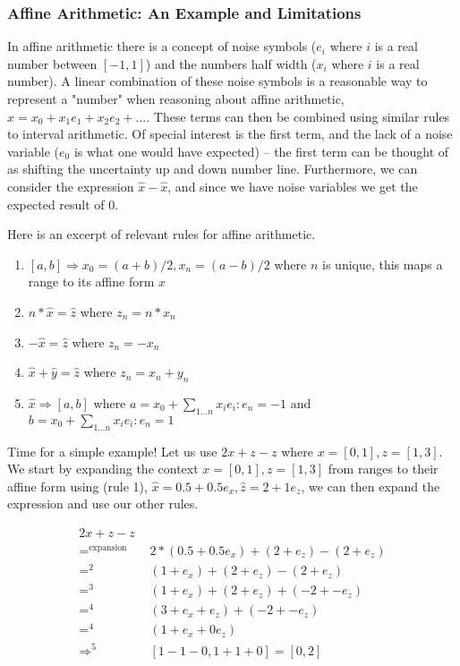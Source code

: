 \subsubsection{Affine Arithmetic: An Example and Limitations}
In affine arithmetic there is a concept of noise symbols ($e_i$ where $i$ is a real number between $[-1, 1]$) and the numbers half width ($x_i$ where $i$ is a real number). A linear combination of these noise symbols is a reasonable way to represent a "number" when reasoning about affine arithmetic, $\hat{x} = x_0 + x_1e_1 + x_2e_2 + \dots$. These terms can then be combined using similar rules to interval arithmetic. Of special interest is the first term, and the lack of a noise variable ($e_0$ is what one would have expected) -- the first term can be thought of as shifting the uncertainty up and down number line. Furthermore, we can consider the expression $\hat{x} - \hat{x}$, and since we have noise variables we get the expected result of $0$.\cite{src:affAri} 

Here is an excerpt of relevant rules for affine arithmetic.
\begin{enumerate}
  \item $[a, b] \Rightarrow x_0 = (a + b) / 2, x_n = (a - b) / 2$ where $n$ is unique, this maps a range to its affine form $\hat{x}$
  \item $n * \hat{x} = \hat{z}$ where $z_n = n * x_n$
  \item $-\hat{x} = \hat{z}$ where $z_n = -x_n$
  \item $\hat{x} + \hat{y} = \hat{z}$ where $z_n = x_n + y_n$
  \item $\hat{x} \Rightarrow [a, b]$ where $a = x_0 + \sum_{1\dots{}n}{x_ie_i}: e_n = -1$ and $b = x_0 + \sum_{1\dots{}n}{x_ie_i}: e_n = 1$
\end{enumerate}

Time for a simple example! Let us use $2x + z - z$ where $x = [0, 1], z = [1, 3]$.
We start by expanding the context $x = [0, 1], z = [1, 3]$ from ranges to their affine form using (rule 1), $\hat{x} = 0.5 + 0.5e_x, \hat{z} = 2 + 1e_z$, we can then expand the expression and use our other rules.

\begin{align*}
    2x + z - z \\
    =^{\text{expansion}} \quad & 2 * (0.5 + 0.5e_x) + (2 + e_z) - (2 + e_z) \\
    =^{2} \quad & (1 + e_x) + (2 + e_z) - (2 + e_z) \\
    =^{3} \quad & (1 + e_x) + (2 + e_z) + (-2 + -e_z) \\
    =^{4} \quad & (3 + e_x + e_z) + (-2 + -e_z) \\
    =^{4} \quad & (1 + e_x + 0e_z) \\
    \Rightarrow^{5} \quad & [1 - 1 - 0, 1 + 1 + 0] = [0, 2]\\
\end{align*}

